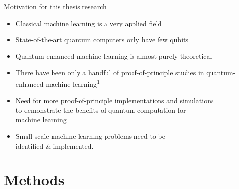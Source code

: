 \documentclass[10pt]{beamer}
\begin{document}
{
\begin{frame}[fragile]{Motivation for this thesis research}

\begin{itemize}
\item Classical machine learning is a very applied field
\item State-of-the-art quantum computers only have few qubits
\item Quantum-enhanced machine learning is almost purely theoretical
\item There have been only a handful of proof-of-principle studies in quantum-enhanced machine learning\textsuperscript{1}
\item Need for more proof-of-principle implementations and simulations\\ to demonstrate the benefits of quantum computation for\\machine learning
\item Small-scale machine learning problems need to be\\ identified \& implemented.
\end{itemize}

\end{frame}
}

\section{Methods}
\end{document}

